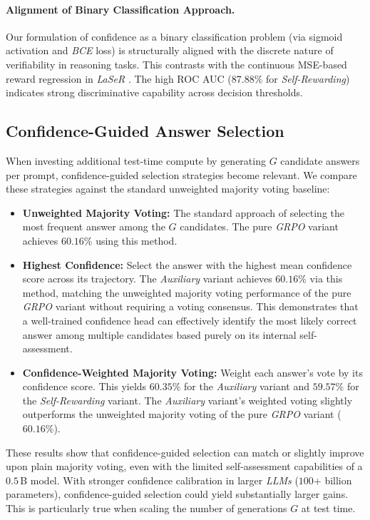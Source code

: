 \documentclass[a4paper,oneside,10pt,ngerman,english]{scrartcl}
\begin{document}
\paragraph{Alignment of Binary Classification Approach.}
Our formulation of confidence as a binary classification problem (via sigmoid activation and \textit{BCE} loss) is structurally aligned with the discrete nature of verifiability in reasoning tasks. This contrasts with the continuous MSE-based reward regression in \textit{LaSeR} \citep{laser}. The high ROC AUC ($87.88\%$ for \textit{Self-Rewarding}) indicates strong discriminative capability across decision thresholds.

\subsection{Confidence-Guided Answer Selection}
\label{sec:confidence_selection}
When investing additional test-time compute by generating $G$ candidate answers per prompt, confidence-guided selection strategies become relevant. We compare these strategies against the standard unweighted majority voting baseline:

\begin{itemize}
	\item \textbf{Unweighted Majority Voting:} The standard approach of selecting the most frequent answer among the $G$ candidates. The pure \textit{GRPO} variant achieves $60.16\%$ using this method.
	\item \textbf{Highest Confidence:} Select the answer with the highest mean confidence score across its trajectory. The \textit{Auxiliary} variant achieves $60.16\%$ via this method, matching the unweighted majority voting performance of the pure \textit{GRPO} variant without requiring a voting consensus. This demonstrates that a well-trained confidence head can effectively identify the most likely correct answer among multiple candidates based purely on its internal self-assessment.
	\item \textbf{Confidence-Weighted Majority Voting:} Weight each answer's vote by its confidence score. This yields $60.35\%$ for the \textit{Auxiliary} variant and $59.57\%$ for the \textit{Self-Rewarding} variant. The \textit{Auxiliary} variant's weighted voting slightly outperforms the unweighted majority voting of the pure \textit{GRPO} variant ($60.16\%$).
\end{itemize}

These results show that confidence-guided selection can match or slightly improve upon plain majority voting, even with the limited self-assessment capabilities of a $0.5\,$B model. With stronger confidence calibration in larger \textit{LLMs} ($100$+ billion parameters), confidence-guided selection could yield substantially larger gains. This is particularly true when scaling the number of generations $G$ at test time.
\end{document}
